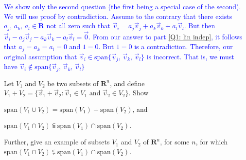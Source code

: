 \documentclass[a4paper,11pt]{article}
\newcommand{\R}{\mathbf{R}}
\newcommand{\BB}[1]{\textcolor{blue}{#1}}
\begin{document}
\begin{enumerate}[(a)]
  \BB{We show only the second question (the first being a special case of the
    second). We will use proof by contradiction. Assume to the contrary that
    there exists $a_j,\,a_k,\,a_l \in \R$ not all zero such that $\vec v_i
    = a_j\vec v_j + a_k\vec v_k + a_l\vec v_l$. But then $\vec v_i - a_j\vec v_j
    - a_k\vec v_k - a_l\vec v_l = \vec 0$. From our answer to part \ref{Q1: lin
      indep}, it follows that $a_j=a_k=a_l=0$ and $1=0$. But $1=0$ is a
    contradiction. Therefore, our original assumption that $\vec v_i \in
    \text{span}\{\vec v_j,\,\vec v_k,\,\vec v_l\}$ is incorrect. That is, we
    must have $\vec v_i \notin \text{span}\{\vec v_j,\,\vec v_k,\,\vec v_l\}$ \\}
\end{enumerate}

 Let $V_1$ and $V_2$ be two subsets of $\R^n$, and
define $V_1+V_2=\{\vec v_1 + \vec v_2 : \vec v_1 \in V_1 \text{ and } \vec v_2
\in V_2 \}$. Show
\begin{enumerate*}[(a)]
\item $\text{span}(V_1 \cup V_2) = \text{span}(V_1) + \text{span}(V_2)$, and
\item $\text{span}(V_1 \cap V_2) \subseteqq \text{span}(V_1) \cap
  \text{span}(V_2)$.
\end{enumerate*}
Further, give an example of subsets $V_1$ and $V_2$ of $\R^n$, for some $n$, for
which $\text{span}(V_1 \cap V_2) \subsetneqq \text{span}(V_1) \cap
\text{span}(V_2)$. \\
\end{document}
